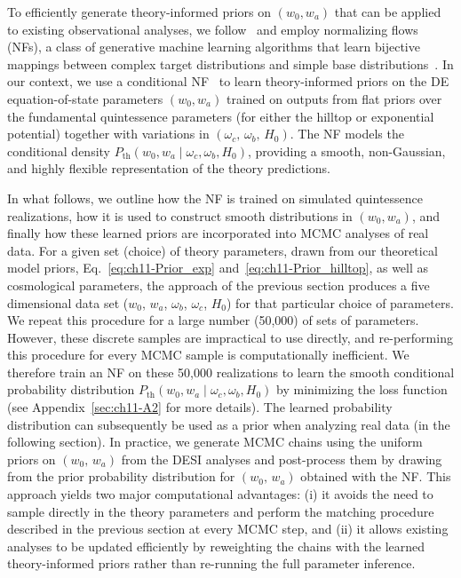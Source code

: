 \noindent
To efficiently generate theory-informed priors on $(w_0, w_a)$ that can be applied to existing observational analyses, we follow~\cite{Toomey:2024ita} and employ normalizing flows (NFs), a class of generative machine learning algorithms that learn bijective mappings between complex target distributions and simple base distributions~\cite{nfs}. In our context, we use a conditional NF~\cite{nfs, 2017arXiv170507057P}
 to learn theory-informed priors on the DE equation-of-state parameters $(w_0, w_a)$   trained on outputs from flat priors over the fundamental quintessence parameters (for either the hilltop or exponential potential) together with variations in $(\omega_c,\,\omega_b, \,H_0)$. The NF models the conditional density $P_{\mathrm{th}}(w_0, w_a \mid \omega_c, \omega_b, H_0)$, providing a smooth, non-Gaussian, and highly flexible representation of the theory predictions.

 In what follows, we outline how the NF is trained on simulated quintessence realizations, how it is used to construct smooth distributions in $(w_0, w_a)$, and finally how these learned priors are incorporated into MCMC analyses of real data. For a given set (choice) of theory parameters, drawn from our
theoretical model priors, Eq.~\eqref{eq:ch11-Prior_exp} and~\eqref{eq:ch11-Prior_hilltop}, as well as cosmological parameters, the approach of the previous section produces a five dimensional data set ($w_0$, $w_a$, $\omega_b$, $\omega_c$, $H_0$) for that particular choice of parameters. We repeat this procedure for a large number (50,000) of sets of parameters. However, these discrete samples are impractical to use directly, and re-performing this procedure for every MCMC sample is computationally inefficient. We therefore train an NF on these 50,000 realizations to learn the smooth conditional probability distribution $P_{\mathrm{th}}(w_0, w_a \mid \omega_c, \omega_b, H_0)$ by minimizing the loss function (see Appendix~\ref{sec:ch11-A2} for more details). The learned  probability distribution can subsequently be used as a prior when analyzing real data (in the following section). In practice, we generate MCMC chains using the uniform priors on $(w_0,\, w_a)$ from the DESI analyses and post-process them by drawing from the prior probability distribution for $(w_0,\,w_a)$ obtained with the NF. This approach yields two major computational advantages: (i) it avoids the need to sample directly in the theory parameters and perform the matching procedure described in the previous section at every MCMC step, and (ii) it allows existing analyses to be updated efficiently by reweighting the chains with the learned theory-informed priors rather than re-running the full parameter inference.

